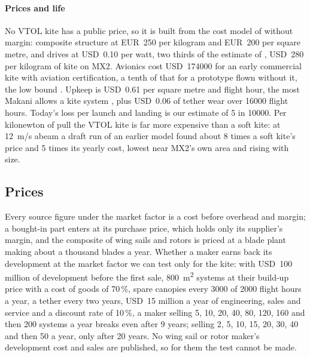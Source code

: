 \paragraph{Prices and life} No VTOL kite has a public price, so it is built from the cost model of \citet{joshi2025} without margin: composite structure at EUR~250 per kilogram and EUR~200 per square metre, and drives at USD~0.10 per watt, two thirds of the estimate of \citet{bauer2018}, USD~280 per kilogram of kite on MX2. Avionics cost USD~\num{174000} for an early commercial kite with aviation certification, a tenth of that for a prototype flown without it, the low bound \citep{joshi2025}. Upkeep is USD~0.61 per square metre and flight hour, the most Makani allows a kite system \citep{echeverri2020part1}, plus USD~0.06 of tether wear over \num{16000} flight hours. Today's loss per launch and landing is our estimate of 5 in \num{10000}. Per kilonewton of pull the VTOL kite is far more expensive than a soft kite: at \SI{12}{m/s} abeam a draft run of an earlier model found about 8 times a soft kite's price and 5 times its yearly cost, lowest near MX2's own area and rising with size.

\subsection{Prices}
\label{app:prices}
Every source figure under the market factor is a cost before overhead and margin; a bought-in part enters at its purchase price, which holds only its supplier's margin, and the composite of wing sails and rotors is priced at a blade plant making about a thousand blades a year. Whether a maker earns back its development at the market factor we can test only for the kite: with USD~100 million of development before the first sale, \SI{800}{m^2} systems at their build-up price with a cost of goods of 70\,\%, spare canopies every \num{3000} of \num{2000} flight hours a year, a tether every two years, USD~15 million a year of engineering, sales and service and a discount rate of 10\,\%, a maker selling 5, 10, 20, 40, 80, 120, 160 and then 200 systems a year breaks even after 9 years; selling 2, 5, 10, 15, 20, 30, 40 and then 50 a year, only after 20 years. No wing sail or rotor maker's development cost and sales are published, so for them the test cannot be made.
